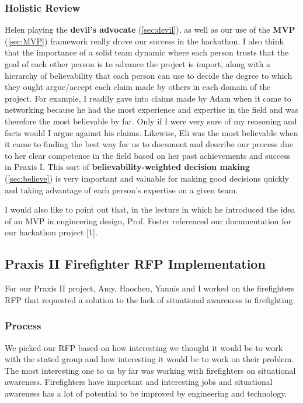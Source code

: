\documentclass[a4paper,12pt]{article}
\begin{document}
\subsubsection{Holistic Review}

Helen playing the \textbf{devil’s advocate} (\ref{sec:devil}), as well as our use of the \textbf{MVP} (\ref{sec:MVP}) framework really drove our success in the hackathon. I also think that the importance of a solid team dynamic where each person trusts that the goal of each other person is to advance the project is import, along with a hierarchy of believability that each person can use to decide the degree to which they ought argue/accept each claim made by others in each domain of the project. For example, I readily gave into claims made by Adam when it came to networking because he had the most experience and expertise in the field and was therefore the most believable by far. Only if I were very sure of my reasoning and facts would I argue against his claims. Likewise, Eli was the most believable when it came to finding the best way for us to document and describe our process due to her clear competence in the field based on her past achievements and success in Praxis I. This sort of \textbf{believability-weighted decision making} (\ref{sec:believe}) is very important and valuable for making good decisions quickly and taking advantage of each person’s expertise on a given team.

I would also like to point out that, in the lecture in which he introduced the idea of an MVP in engineering design, Prof. Foster referenced our documentation for our hackathon project [1].

\subsection{Praxis II Firefighter RFP Implementation}
\label{sec:fire}
For our Praxis II project, Amy, Haochen, Yannis and I worked on the firefighters RFP that requested a solution to the lack of situational awareness in firefighting.

\subsubsection{Process}
We picked our RFP based on how interesting we thought it would be to work with the stated group and how interesting it would be to work on their problem. The most interesting one to us by far was working with firefighters on situational awareness. Firefighters have important and interesting jobs and situational awareness has a lot of potential to be improved by engineering and technology.
\end{document}
